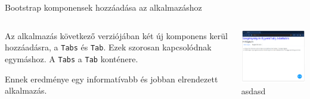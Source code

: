 \documentclass[english, aspectratio=169]{beamer}
\begin{document}
\begin{frame}[fragile]{Bootstrap komponensek hozzáadása az alkalmazáshoz}
	\begin{columns}
		\begin{column}{.5\textwidth}
			Az alkalmazás következő verziójában két új komponens kerül hozzáadásra, a \texttt{Tabs} és \texttt{Tab}. Ezek szorosan kapcsolódnak egymáshoz. A \texttt{Tabs} a \texttt{Tab} konténere.\par\smallskip
			Ennek eredménye egy informatívabb és jobban elrendezett alkalmazás. 
		\end{column}
		\begin{column}{.5\textwidth}
			\begin{center}
				\includegraphics[width=6cm, keepaspectratio]{images/dash_11.png}
				asdasd
			\end{center}
		\end{column}
	\end{columns}
\end{frame}
\end{document}
